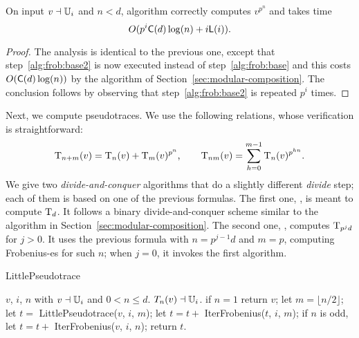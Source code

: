 \begin{theorem}
  \label{th:l-ifrob}
  On input $v\dashv\mathbb{U}_i$ and $n<d$, algorithm 
  correctly computes $v^{p^n}$ and takes time 
  \begin{equation}
    \label{eq:94}
    O(p^i\mathsf{C}(d)\log (n) + i\mathsf{L}(i))
    \text{.}    
  \end{equation}
\end{theorem}
\begin{proof}
  The analysis is identical to the previous one, except that
  step~\ref{alg:frob:base2} is now executed instead of
  step~\ref{alg:frob:base} and this costs $O(\mathsf{C}(d)\log (n))$ by
  the algorithm of Section~\ref{sec:modular-composition}. The
  conclusion follows by observing that step~\ref{alg:frob:base2} is
  repeated $p^i$ times.
\end{proof}

Next, we compute pseudotraces. We use the following relations, whose
verification is straightforward:
\begin{equation}
  \operatorname{T}_{n+m}(v) =
  \operatorname{T}_{n}(v) + \operatorname{T}_{m}(v)^{p^n}
  \text{,}\qquad
  \operatorname{T}_{nm}(v) =
  \sum_{h=0}^{m-1}\operatorname{T}_{n}(v)^{p^{hn}}
  \text{.}
\end{equation}
We give two \emph{divide-and-conquer} algorithms that do a slightly
different \emph{divide} step; each of them is based on one of the
previous formulas. The first one, , is meant to
compute $\operatorname{T}_d$. It follows a binary divide-and-conquer scheme
similar to the algorithm in Section~\ref{sec:modular-composition}. The
second one, , computes $\operatorname{T}_{p^jd}$ for $j>0$. It
uses the previous formula with $n=p^{j-1}d$ and $m=p$, computing
Frobenius-es for such $n$; when $j=0$, it invokes the first algorithm.


\begin{algorithm}
  \caption{LittlePseudotrace}
  \begin{algorithmic}[1]
    \REQUIRE $v$, $i$, $n$ with $v\dashv\mathbb{U}_i$ and $0<n\le d$.
    \ENSURE $T_{n}(v) \dashv \mathbb{U}_i$.
    \STATE \label{alg:lpseudo:base} if $n = 1$ return $v$;
    \STATE \label{alg:lpseudo:half} let $m = \lfloor n/2 \rfloor$;
    \STATE \label{alg:lpseudo:rec} let $t=$ {\sf LittlePseudotrace}($v$,
    $i$, $m$);
    \STATE \label{alg:lpseudo:frob} let $t=t+$ {\sf IterFrobenius}($t$, $i$, $m$);
    \STATE \label{alg:lpseudo:odd} if $n$ is odd, let $t=t+$ {\sf
      IterFrobenius}($v$, $i$, $n$);
    \STATE return $t$.
  \end{algorithmic}
\end{algorithm}

